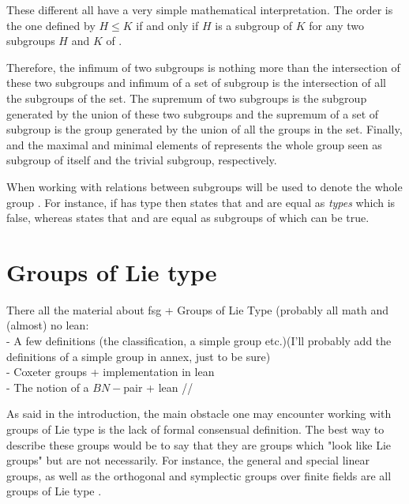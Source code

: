 These different all have a very simple mathematical interpretation. The order is the one defined by $H \le K$ if and only if $H$ is a subgroup of $K$ for any two subgroups $H$ and $K$ of .

Therefore, the infimum of two subgroups is nothing more than the intersection of these two subgroups and infimum of a set of subgroup is the intersection of all the subgroups of the set. The supremum of two subgroups is the subgroup generated by the union of these two subgroups and the supremum of a set of subgroup is the group generated by the union of all the groups in the set. Finally,  and  the maximal and minimal elements of  represents the whole group  seen as subgroup of itself and the trivial subgroup, respectively.

\begin{remarque}
    When working with relations between subgroups  will be used to denote the whole group . For instance, if  has type  then  states that  and  are equal as \emph{types} which is false, whereas  states that  and  are equal as subgroups of  which can be true.
\end{remarque}

\section{Groups of Lie type}
{\color{green} There all the material about fsg + Groups of Lie Type (probably all math and (almost) no lean: \\
- A few definitions (the classification, a simple group etc.)(I'll probably add the definitions of a simple group in annex, just to be sure)\\
- Coxeter groups + implementation in lean \\
- The notion of a $BN-$pair + lean //}


As said in the introduction, the main obstacle one may encounter working  with groups of Lie type is the lack of formal consensual definition. The best way to describe these groups would be to say that they are groups which "look like Lie groups" but are not necessarily. For instance, the general and special linear groups, as well as the orthogonal and symplectic groups over finite fields are all groups of Lie type .  


